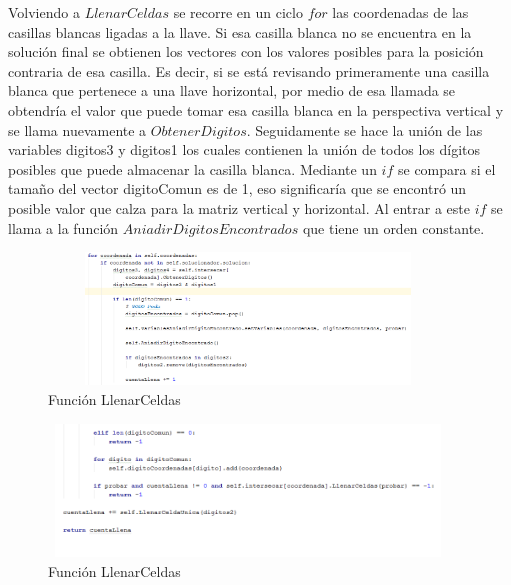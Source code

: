 \documentclass[journal]{IEEEtran}
\begin{document}
\begin{itemize}
		
		Volviendo a $LlenarCeldas$ se recorre en un ciclo $for$ las coordenadas de las casillas blancas ligadas a la llave. Si esa casilla blanca no se encuentra en la solución final se obtienen los vectores con los valores posibles para la posición contraria de esa casilla. Es decir, si se está revisando primeramente una casilla blanca que pertenece a una llave horizontal, por medio de esa llamada se obtendría el valor que puede tomar esa casilla blanca en la perspectiva vertical y se llama nuevamente a $ObtenerDigitos$. 
		Seguidamente se hace la unión de las variables digitos3 y digitos1 los cuales contienen la unión de todos los dígitos posibles que puede almacenar la casilla blanca. Mediante un $if$ se compara si 
		el tamaño del vector digitoComun es de 1, eso significaría que se encontró un posible valor que calza para la matriz vertical y horizontal. Al entrar a este $if$ se llama a la función $AniadirDigitosEncontrados$ que tiene un orden constante. 
		
		\begin{figure}[h]
			\centering
			\includegraphics[height= 100pt, width=300pt]{LlenarCeldas2.png}
			\caption{Función LlenarCeldas}
		\end{figure}
	
		\begin{figure}[h]
			\centering
			\includegraphics[height= 100pt, width=300pt]{LlenarCeldas3.png}
			\caption{Función LlenarCeldas}
		\end{figure}
		

\end{itemize}
\end{document}
